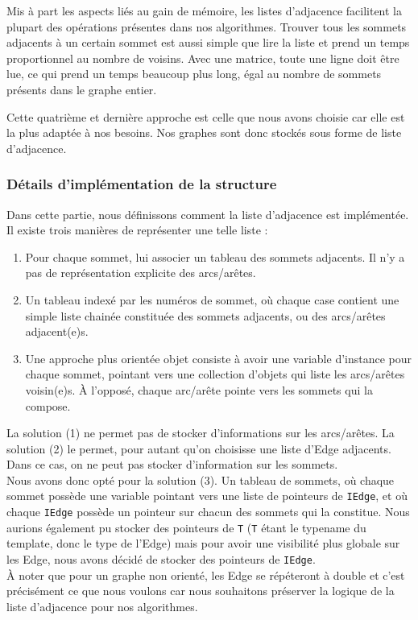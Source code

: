 \documentclass[french]{article}
\begin{document}
			Mis à part les aspects liés au gain de mémoire, les listes d'adjacence facilitent la plupart des opérations présentes dans nos algorithmes.
			Trouver tous les sommets adjacents à un certain sommet est aussi simple que lire la liste et prend un temps proportionnel au nombre de voisins. Avec une matrice, toute une ligne doit être lue, ce qui prend un temps beaucoup plus long, égal au nombre de sommets présents dans le graphe entier.
			
			Cette quatrième et dernière approche est celle que nous avons choisie car elle est la plus adaptée à nos besoins. Nos graphes sont donc stockés sous forme de liste d'adjacence.
			
			\subsubsection{Détails d'implémentation de la structure}
			Dans cette partie, nous définissons comment la liste d'adjacence est implémentée. Il existe trois manières de représenter une telle liste :
			\begin{enumerate}
				\item Pour chaque sommet, lui associer un tableau des sommets adjacents. Il n'y a pas de représentation explicite des arcs/arêtes.
				\item Un tableau indexé par les numéros de sommet, où chaque case contient une simple liste chainée constituée des sommets adjacents, ou des arcs/arêtes adjacent(e)s.
				\item Une approche plus orientée objet consiste à avoir une variable d'instance pour chaque sommet, pointant vers une collection d'objets qui liste les arcs/arêtes voisin(e)s. À l'opposé, chaque arc/arête pointe vers les sommets qui la compose. 
			\end{enumerate}
			La solution (1) ne permet pas de stocker d'informations sur les arcs/arêtes. La solution (2) le permet, pour autant qu'on choisisse une liste d'Edge adjacents. Dans ce cas, on ne peut pas stocker d'information sur les sommets.\\
			
			Nous avons donc opté pour la solution (3). Un tableau de sommets, où chaque sommet possède une variable pointant vers une liste de pointeurs de \lstinline[basicstyle=\ttfamily\color{blue}]|IEdge|, et où chaque \lstinline[basicstyle=\ttfamily\color{blue}]|IEdge| possède un pointeur sur chacun des sommets qui la constitue. Nous aurions également pu stocker des pointeurs de \lstinline[basicstyle=\ttfamily\color{blue}]|T| (\lstinline[basicstyle=\ttfamily\color{blue}]|T| étant le typename du template, donc le type de l'Edge) mais pour avoir une visibilité plus globale sur les Edge, nous avons décidé de stocker des pointeurs de \lstinline[basicstyle=\ttfamily\color{blue}]|IEdge|.\\
			À noter que pour un graphe non orienté, les Edge se répéteront à double et c'est précisément ce que nous voulons car nous souhaitons préserver la logique de la liste d'adjacence pour nos algorithmes.\\
			
\end{document}
